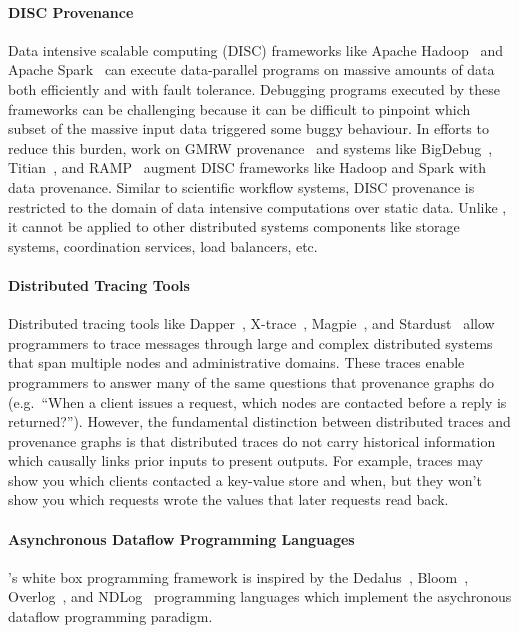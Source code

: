 \paragraph{DISC Provenance}
Data intensive scalable computing (DISC) frameworks like Apache
Hadoop~\cite{shvachko2010hadoop} and Apache Spark~\cite{zaharia2010spark} can
execute data-parallel programs on massive amounts of data both efficiently and
with fault tolerance. Debugging programs executed by these frameworks can be
challenging because it can be difficult to pinpoint which subset of the massive
input data triggered some buggy behaviour. In efforts to reduce this burden,
work on GMRW provenance~\cite{ikeda2011provenance} and systems like
BigDebug~\cite{gulzar2016bigdebug}, Titian~\cite{interlandi2015titian}, and
RAMP~\cite{park2011ramp} augment DISC frameworks like Hadoop and Spark with
data provenance. Similar to scientific workflow systems, DISC provenance is
restricted to the domain of data intensive computations over static data.
Unlike \watprovenance{}, it cannot be applied to other distributed systems
components like storage systems, coordination services, load balancers, etc.

\paragraph{Distributed Tracing Tools}
Distributed tracing tools like Dapper~\cite{sigelman2010dapper},
X-trace~\cite{fonseca2007x}, Magpie~\cite{barham2003magpie}, and
Stardust~\cite{thereska2006stardust} allow programmers to trace messages
through large and complex distributed systems that span multiple nodes and
administrative domains. These traces enable programmers to answer many of the
same questions that provenance graphs do (e.g.\ ``When a client issues a
request, which nodes are contacted before a reply is returned?''). However, the
fundamental distinction between distributed traces and provenance graphs is
that distributed traces do not carry historical information which causally
links prior inputs to present outputs. For example, traces may show you which
clients contacted a key-value store and when, but they won't show you which
requests wrote the values that later requests read back.

\paragraph{Asynchronous Dataflow Programming Languages}
\fluent{}'s white box programming framework is inspired by the
Dedalus~\cite{alvaro2011dedalus}, Bloom~\cite{alvaro2011consistency,
conway2012logic}, Overlog~\cite{loo2005implementing}, and
NDLog~\cite{loo2009declarative} programming languages which implement the
asychronous dataflow programming paradigm.
